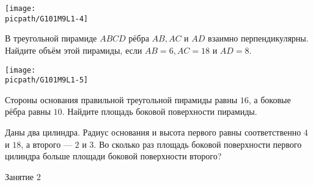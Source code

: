 \begin{class}[number=1]
\begin{listofex}
		\hspace{0.02\linewidth}
		\begin{minipage}[t]{\picwidth}
			\texttt{[image: \\picpath/G101M9L1-4]}
		\end{minipage}
		\item 
		\begin{minipage}[t]{\bodywidth}
			В треугольной пирамиде \(ABCD\) рёбра \(AB, AC\) и \(AD\) взаимно перпендикулярны. Найдите объём этой пирамиды, если \(AB = 6, AC = 18\) и \(AD = 8\).
		\end{minipage}
		\hspace{0.02\linewidth}
		\begin{minipage}[t]{\picwidth}
			\texttt{[image: \\picpath/G101M9L1-5]}
		\end{minipage}
		\newpage
		\item Стороны основания правильной треугольной пирамиды равны \(16\), а боковые рёбра равны \(10\). Найдите площадь боковой поверхности пирамиды.
		\item Даны два цилиндра. Радиус основания и высота первого равны соответственно \(4\) и \(18\), а второго --- \(2\) и \(3\). Во сколько раз площадь боковой поверхности первого цилиндра больше площади боковой поверхности второго?
		
		
	\end{listofex}
\end{class}

\begin{class}[number=2]
	\begin{listofex}
		\item Занятие 2
	\end{listofex}
\end{class}

